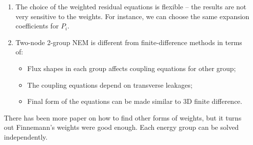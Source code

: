 \documentclass{school-22.211-notes}
\begin{document}
\begin{enumerate}
  \item The choice of the weighted residual equations is flexible -- the results are not very sensitive to the weights. For instance, we can choose the same expansion coefficients for $P_i$. 

  \item Two-node 2-group NEM is different from finite-difference methods in terms of: 
    \begin{itemize}
      \item Flux shapes in each group affects coupling equations for other group;
      \item The coupling equations depend on transverse leakages;
      \item Final form of the equations can be made similar to 3D finite difference. 
    \end{itemize}
  \end{enumerate}
There has been more paper on how to find other forms of weights, but it turns out Finnemann's weights were good enough. Each energy group can be solved independently. 
\end{document}
